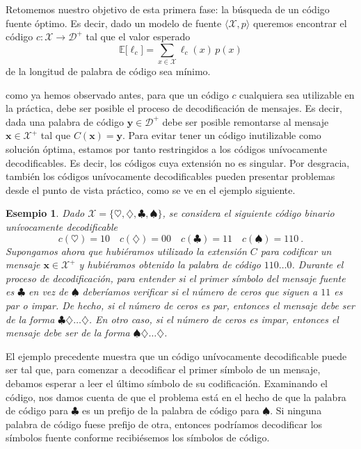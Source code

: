 \documentclass[11pt]{article}
\newtheorem{example}[theorem]{Esempio}
\newcommand{\bx}{ \boldsymbol{x} }
\newcommand{\by}{ \boldsymbol{y} }
\newcommand{\scD}{\mathcal{D}}
\newcommand{\scX}{\mathcal{X}}
\newcommand{\field}[1]{\mathbb{#1}}
\newcommand{\E}{\field{E}}
\begin{document}
\begin{center}
\end{center}

\bigskip

Retomemos nuestro objetivo de esta primera fase: la búsqueda de un código fuente óptimo. Es decir, dado un modelo de fuente $\langle\scX,p\rangle$ queremos encontrar el código $c : \scX\to\scD^+$ tal que el valor esperado
\begin{equation}
\label{eq:obj}
    \E\bigl[\ell_c\bigr] = \sum_{x\in\scX} \ell_c(x)\,p(x)
\end{equation}
de la longitud de palabra de código sea mínimo.

como ya hemos observado antes, para que un código $c$ cualquiera sea utilizable en la práctica, debe ser posible el proceso de decodificación de mensajes. Es decir, dada una palabra de código $\by\in\scD^+$ debe ser posible remontarse al mensaje $\bx\in\scX^+$ tal que $C(\bx)=\by$. Para evitar tener un código inutilizable como solución óptima, estamos por tanto restringidos a los códigos unívocamente decodificables. Es decir, los códigos cuya extensión no es singular. Por desgracia, también los códigos unívocamente decodificables pueden presentar problemas desde el punto de vista práctico, como se ve en el ejemplo siguiente.
%
\begin{example}
\label{ex:ud}
Dado $\scX = \{\heartsuit,\diamondsuit,\clubsuit,\spadesuit\}$, se considera el siguiente código binario unívocamente decodificable
\[
    c(\heartsuit) = 10 \quad c(\diamondsuit) = 00 \quad c(\clubsuit) = 11 \quad c(\spadesuit) = 110~.
\]
Supongamos ahora que hubiéramos utilizado la extensión $C$ para codificar un mensaje $\bx\in\scX^+$ y hubiéramos obtenido la palabra de código $110\dots 0$. Durante el proceso de decodificación, para entender si el primer símbolo del mensaje fuente es $\clubsuit$ en vez de $\spadesuit$ deberíamos verificar si el número de ceros que siguen a $11$ es par o impar. De hecho, si el número de ceros es par, entonces el mensaje debe ser de la forma $\clubsuit\diamondsuit\dots\diamondsuit$. En otro caso, si el número de ceros es impar, entonces el mensaje debe ser de la forma $\spadesuit\diamondsuit\dots\diamondsuit$.
\end{example}
%
El ejemplo precedente muestra que un código unívocamente decodificable puede ser tal que, para comenzar a decodificar el primer símbolo de un mensaje, debamos esperar a leer el último símbolo de su codificación. Examinando el código, nos damos cuenta de que el problema está en el hecho de que la palabra de código para $\clubsuit$ es un prefijo de la palabra de código para $\spadesuit$. Si ninguna palabra de código fuese prefijo de otra, entonces podríamos decodificar los símbolos fuente conforme recibiésemos los símbolos de código.
\end{document}
